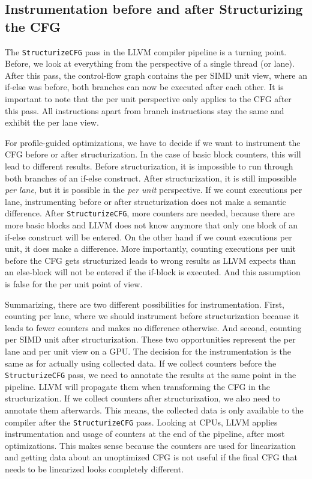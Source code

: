 \clearpage
{}
\label{sec:discussion}

\subsection{Instrumentation before and after Structurizing the CFG}
\label{sub:discussion_structurize}
The \texttt{StructurizeCFG} pass in the LLVM compiler pipeline is a turning point. Before, we look at everything from the perspective of a single thread (or lane).
After this pass, the control-flow graph contains the per SIMD unit view, where an if-else was before, both branches can now be executed after each other.
It is important to note that the per unit perspective only applies to the CFG after this pass. All instructions apart from branch instructions stay the same and exhibit the per lane view.

For profile-guided optimizations, we have to decide if we want to instrument the CFG before or after structurization. In the case of basic block counters, this will lead to different results.
Before structurization, it is impossible to run through both branches of an if-else construct. After structurization, it is still impossible \emph{per lane}, but it is possible in the \emph{per unit} perspective.
If we count executions per lane, instrumenting before or after structurization does not make a semantic difference.
After \texttt{StructurizeCFG}, more counters are needed, because there are more basic blocks and LLVM does not know anymore that only one block of an if-else construct will be entered.
On the other hand if we count executions per unit, it does make a difference. More importantly, counting executions per unit before the CFG gets structurized leads to wrong results as LLVM expects than an else-block will not be entered if the if-block is executed. And this assumption is false for the per unit point of view.

Summarizing, there are two different possibilities for instrumentation. First, counting per lane, where we should instrument before structurization because it leads to fewer counters and makes no difference otherwise.
And second, counting per SIMD unit after structurization.
These two opportunities represent the per lane and per unit view on a GPU.
The decision for the instrumentation is the same as for actually using collected data. If we collect counters before the \texttt{StructurizeCFG} pass, we need to annotate the results at the same point in the pipeline.
LLVM will propagate them when transforming the CFG in the structurization.
If we collect counters after structurization, we also need to annotate them afterwards. This means, the collected data is only available to the compiler after the \texttt{StructurizeCFG} pass.
Looking at CPUs, LLVM applies instrumentation and usage of counters at the end of the pipeline, after most optimizations.
This makes sense because the counters are used for linearization and getting data about an unoptimized CFG is not useful if the final CFG that needs to be linearized looks completely different.

